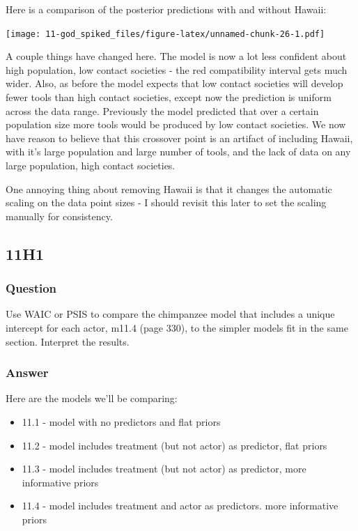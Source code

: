 \documentclass[
]{book}
\providecommand{\tightlist}{%
  \setlength{\itemsep}{0pt}\setlength{\parskip}{0pt}}
\begin{document}
Here is a comparison of the posterior predictions with and without Hawaii:

\texttt{[image: 11-god\_spiked\_files/figure-latex/unnamed-chunk-26-1.pdf]}

A couple things have changed here. The model is now a lot less confident about high population, low contact societies - the red compatibility interval gets much wider.
Also, as before the model expects that low contact societies will develop fewer tools than high contact societies, except now the prediction is uniform across the data range. Previously the model predicted that over a certain population size more tools would be produced by low contact societies. We now have reason to believe that this crossover point is an artifact of including Hawaii, with it's large population and large number of tools, and the lack of data on any large population, high contact societies.

One annoying thing about removing Hawaii is that it changes the automatic scaling on the data point sizes - I should revisit this later to set the scaling manually for consistency.

\hypertarget{h1-4}{%
\subsection*{11H1}\label{h1-4}}

\hypertarget{question-93}{%
\subsubsection*{Question}\label{question-93}}

Use WAIC or PSIS to compare the chimpanzee model that includes a unique intercept for each actor, m11.4 (page 330), to the simpler models fit in the same section. Interpret the results.

\hypertarget{answer-93}{%
\subsubsection*{Answer}\label{answer-93}}

Here are the models we'll be comparing:

\begin{itemize}
\tightlist
\item
  11.1 - model with no predictors and flat priors
\item
  11.2 - model includes treatment (but not actor) as predictor, flat priors
\item
  11.3 - model includes treatment (but not actor) as predictor, more informative priors
\item
  11.4 - model includes treatment and actor as predictors. more informative priors
\end{itemize}
\end{document}
